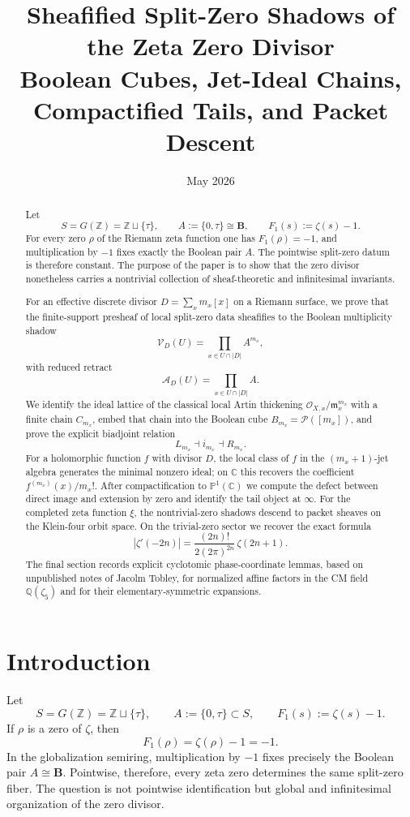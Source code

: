 \documentclass[11pt,a4paper]{article}
\title{Sheafified Split-Zero Shadows of the Zeta Zero Divisor\\
Boolean Cubes, Jet-Ideal Chains, Compactified Tails, and Packet Descent}
\author{}
\date{May 2026}
\theoremstyle{definition}
\theoremstyle{remark}
\newcommand{\ZZ}{\mathbb Z}
\newcommand{\CC}{\mathbb C}
\newcommand{\PP}{\mathbb P}
\newcommand{\BB}{\mathbf B}
\newcommand{\QQ}{\mathbb Q}
\newcommand{\cO}{\mathcal O}
\newcommand{\cP}{\mathcal P}
\newcommand{\cV}{\mathcal V}
\newcommand{\cA}{\mathcal A}
\newcommand{\taup}{\tau}
\begin{document}
\maketitle

\begin{abstract}
Let
\[
S=G(\ZZ)=\ZZ\sqcup\{\taup\},\qquad A:=\{0,\taup\}\cong\BB,
\qquad F_1(s):=\zeta(s)-1.
\]
For every zero $\rho$ of the Riemann zeta function one has $F_1(\rho)=-1$, and multiplication by $-1$ fixes exactly the Boolean pair $A$.  The pointwise split-zero datum is therefore constant.  The purpose of the paper is to show that the zero divisor nonetheless carries a nontrivial collection of sheaf-theoretic and infinitesimal invariants.

For an effective discrete divisor $D=\sum_x m_x[x]$ on a Riemann surface, we prove that the finite-support presheaf of local split-zero data sheafifies to the Boolean multiplicity shadow
\[
\cV_D(U)=\prod_{x\in U\cap |D|}A^{m_x},
\]
with reduced retract
\[
\cA_D(U)=\prod_{x\in U\cap |D|}A.
\]
We identify the ideal lattice of the classical local Artin thickening $\cO_{X,x}/\mathfrak m_x^{m_x}$ with a finite chain $C_{m_x}$, embed that chain into the Boolean cube $B_{m_x}=\cP([m_x])$, and prove the explicit biadjoint relation
\[
L_{m_x}\dashv i_{m_x}\dashv R_{m_x}.
\]
For a holomorphic function $f$ with divisor $D$, the local class of $f$ in the $(m_x+1)$-jet algebra generates the minimal nonzero ideal; on $\CC$ this recovers the coefficient $f^{(m_x)}(x)/m_x!$.  After compactification to $\PP^1(\CC)$ we compute the defect between direct image and extension by zero and identify the tail object at $\infty$.  For the completed zeta function $\xi$, the nontrivial-zero shadows descend to packet sheaves on the Klein-four orbit space.  On the trivial-zero sector we recover the exact formula
\[
|\zeta'(-2n)|=\frac{(2n)!}{2(2\pi)^{2n}}\,\zeta(2n+1).
\]
The final section records explicit cyclotomic phase-coordinate lemmas, based on unpublished notes of Jacolm Tobley, for normalized affine factors in the CM field $\QQ(\zeta_5)$ and for their elementary-symmetric expansions.
\end{abstract}

\tableofcontents

\section{Introduction}

Let
\[
S=G(\ZZ)=\ZZ\sqcup\{\taup\},\qquad A:=\{0,\taup\}\subset S,
\qquad F_1(s):=\zeta(s)-1.
\]
If $\rho$ is a zero of $\zeta$, then
\[
F_1(\rho)=\zeta(\rho)-1=-1.
\]
In the globalization semiring, multiplication by $-1$ fixes precisely the Boolean pair $A\cong\BB$.  Pointwise, therefore, every zeta zero determines the same split-zero fiber.  The question is not pointwise identification but global and infinitesimal organization of the zero divisor.
\end{document}
